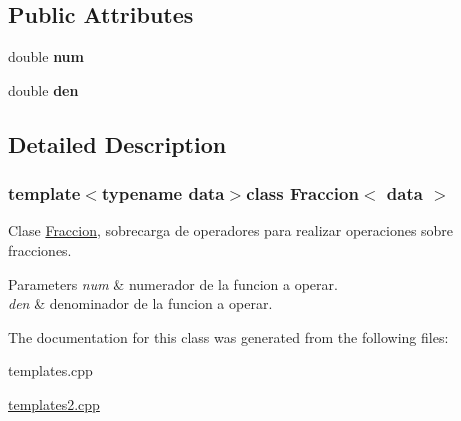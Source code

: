 \subsection*{Public Attributes}
\begin{DoxyCompactItemize}
\item 
\hypertarget{classFraccion_a72e39fb739410e17d8a04ca6975d14d4}{double {\bfseries num}}\label{classFraccion_a72e39fb739410e17d8a04ca6975d14d4}

\item 
\hypertarget{classFraccion_a19be26b9ccadf596763e9b249943cfc5}{double {\bfseries den}}\label{classFraccion_a19be26b9ccadf596763e9b249943cfc5}

\end{DoxyCompactItemize}


\subsection{Detailed Description}
\subsubsection*{template$<$typename data$>$class Fraccion$<$ data $>$}

Clase \hyperlink{classFraccion}{Fraccion}, sobrecarga de operadores para realizar operaciones sobre fracciones. 


\begin{DoxyParams}{Parameters}
{\em num} & numerador de la funcion a operar. \\
\hline
{\em den} & denominador de la funcion a operar. \\
\hline
\end{DoxyParams}


The documentation for this class was generated from the following files\-:\begin{DoxyCompactItemize}
\item 
templates.\-cpp\item 
\hyperlink{templates2_8cpp}{templates2.\-cpp}\end{DoxyCompactItemize}
